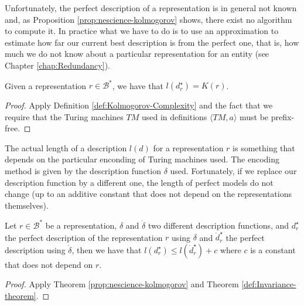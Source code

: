 Unfortunately, the perfect description of a representation is in general not known and, as Proposition \ref{prop:nescience-kolmogorov} shows, there exist no algorithm to compute it. In practice what we have to do is to use an approximation to estimate how far our current best description is from the perfect one, that is, how much we do not know about a particular representation for an entity (see Chapter \ref{chap:Redundancy}).

\begin{proposition}
\label{prop:nescience-kolmogorov}
Given a representation $r \in \mathcal{B}^\ast$, we have that $l \left( d_r^{\star} \right) = K\left( r \right)$.
\end{proposition}
\begin{proof}
Apply Definition \ref{def:Kolmogorov-Complexity} and the fact that we require that the Turing machines $TM$ used in definitions $\langle TM,a\rangle$ must be prefix-free.
\end{proof}

The actual length of a description $l \left( d \right)$ for a representation $r$ is something that depends on the particular enconding of Turing machines used. The encoding method is given by the description function $\delta$ used. Fortunately, if we replace our description function by a different one, the length of perfect models do not change (up to an additive constant that does not depend on the representations themselves).

\begin{corollary}
Let $r \in \mathcal{B}^\ast$ be a representation, $\delta$ and $\dot{\delta}$ two different description functions, and $d_r^{\star}$ the perfect description of the representation $r$ using $\delta$ and $\dot{d}_r^{\star}$ the perfect description using $\dot{\delta}$, then we have that $l \left( d_r^{\star} \right) \leq l \left( \dot{d}_r^{\star} \right) + c$ where $c$ is a constant that does not depend on $r$.
\end{corollary}
\begin{proof}
Apply Theorem \ref{prop:nescience-kolmogorov} and Theorem \ref{def:Invariance-theorem}.
\end{proof}

